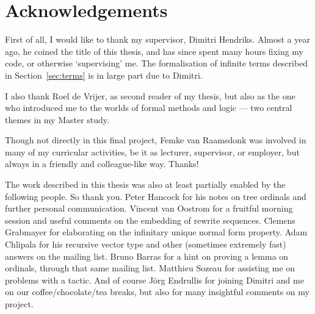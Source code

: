 \chapter*{Acknowledgements}
\thispagestyle{empty}

First of all, I would like to thank my supervisor, Dimitri
Hendriks. Almost a year ago, he coined the title of this thesis, and
has since spent many hours fixing my \Coq code, or otherwise
`supervising' me. The formalisation of infinite terms described in
Section~\ref{sec:terms} is in large part due to Dimitri.

I also thank Roel de Vrijer, as second reader of my thesis, but also
as the one who introduced me to the worlds of formal methods and
logic --- two central themes in my Master study.

Though not directly in this final project, Femke van Raamsdonk was
involved in many of my curricular activities, be it as lecturer,
supervisor, or employer, but always in a friendly and colleague-like
way. Thanks!

The work described in this thesis was also at least partially enabled
by the following people. So thank you. Peter Hancock for his notes on
tree ordinals and further personal communication. Vincent van Oostrom
for a fruitful morning session and useful comments on the embedding of
rewrite sequences. Clemens Grabmayer for elaborating on the infinitary
unique normal form property. Adam Chlipala for his recursive vector type and
other (sometimes extremely fast) answers on the \Coq mailing
list. Bruno Barras for a hint on proving a lemma on ordinals, through
that same mailing list. Matthieu Sozeau for assisting me on problems
with a \Coq tactic. And of course J\"org Endrullis for joining Dimitri
and me on our coffee/chocolate/tea breaks, but also for many insightful
comments on my project.

